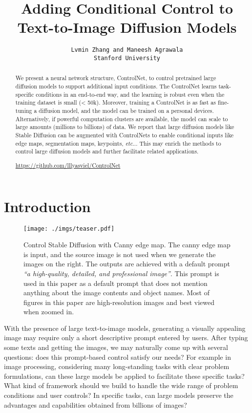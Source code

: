 \documentclass{article}
\title{Adding Conditional Control to Text-to-Image Diffusion Models}
\author{\texttt{Lvmin Zhang and Maneesh Agrawala}\\\texttt{Stanford University}}
\makeatletter
\DeclareRobustCommand\onedot{\futurelet\@let@token\@onedot}
\def\@onedot{\ifx\@let@token.\else.\null\fi\xspace}
\def\etc{\emph{etc}\onedot}
\makeatother
\begin{document}
\maketitle

\begin{abstract}
\vspace{10pt}
We present a neural network structure, ControlNet, to control pretrained large diffusion models to support additional input conditions.
The ControlNet learns task-specific conditions in an end-to-end way, and the learning is robust even when the training dataset is small (< 50k).
Moreover, training a ControlNet is as fast as fine-tuning a diffusion model, and the model can be trained on a personal devices. 
Alternatively, if powerful computation clusters are available, the model can scale to large amounts (millions to billions) of data.
We report that large diffusion models like Stable Diffusion can be augmented with ControlNets to enable conditional inputs like edge maps, segmentation maps, keypoints, \etc.
This may enrich the methods to control large diffusion models and further facilitate related applications.

\vspace{3pt}
{\scriptsize\url{https://github.com/lllyasviel/ControlNet}}
\end{abstract}

\vspace{40pt}

\section{Introduction}

\begin{figure}
	\centering
	\texttt{[image: ./imgs/teaser.pdf]}
	\caption{Control Stable Diffusion with Canny edge map. The canny edge map is input, and the source image is not used when we generate the images on the right. The outputs are achieved with a default prompt \emph{``a high-quality, detailed, and professional image''}. This prompt is used in this paper as a default prompt that does not mention anything about the image contents and object names. Most of figures in this paper are high-resolution images and best viewed when zoomed in.}
	\label{fig:teaser}
\end{figure}

With the presence of large text-to-image models, generating a visually appealing image may require only a short descriptive prompt entered by users. 
After typing some texts and getting the images, we may naturally come up with several questions: does this prompt-based control satisfy our needs? 
For example in image processing, considering many long-standing tasks with clear problem formulations, can these large models be applied to facilitate these specific tasks? 
What kind of framework should we build to handle the wide range of problem conditions and user controls? 
In specific tasks, can large models preserve the advantages and capabilities obtained from billions of images? 
\end{document}
